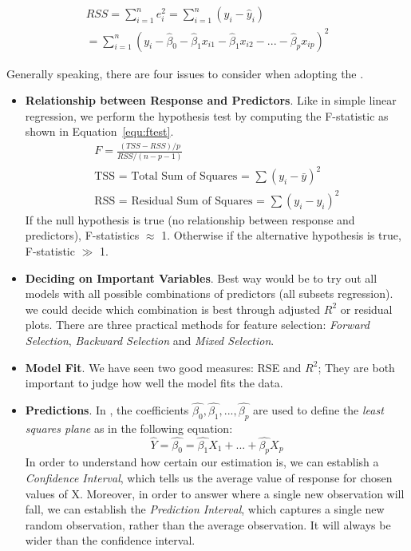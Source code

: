 \begin{multline}
\label{equ:rss}
  RSS = \sum_{i = 1}^{n}{e_i^2} = \sum_{i = 1}^{n}{(y_i - \hat{y}_i)}\\
   = \sum_{i = 1}^{n}{(y_i - \hat{\beta}_0 - \hat{\beta}_1x_{i1} - \hat{\beta}_1x_{i2} - ... - \hat{\beta}_px_{ip})^2}
\end{multline}

Generally speaking, there are four issues to consider when adopting the {\mlr}.
\begin{itemize}
  \item \textbf{Relationship between Response and Predictors}. Like in simple linear regression, we perform the hypothesis test by computing the F-statistic as shown in Equation~\ref{equ:ftest}.
      \begin{multline}\label{equ:ftest}
        F = \frac{(TSS - RSS)/p}{RSS/(n - p - 1)}\\
        \text{TSS = Total Sum of Squares = $\sum{(y_i - \bar{y})^2}$}\\
        \text{RSS = Residual Sum of Squares = $\sum{(y_i - \hat{y_i})^2}$}
      \end{multline}
      If the null hypothesis is true (no relationship between response and predictors), F-statistics $\approx$ 1. Otherwise if the alternative hypothesis is true, F-statistic $\gg$ 1.
  \item \textbf{Deciding on Important Variables}. Best way would be to try out all models with all possible combinations of predictors (all subsets regression). we could decide which combination is best through adjusted $R^2$ or residual plots. There are three practical methods for feature selection: \emph{Forward Selection}, \emph{Backward Selection} and \emph{Mixed Selection}.
  \item \textbf{Model Fit}. We have seen two good measures: RSE and $R^2$; They are both important to judge how well the model fits the data.
  \item \textbf{Predictions}. In {\mlr}, the coefficients $\hat{\beta_0}, \hat{\beta_1},...,\hat{\beta_p}$ are used to define the \emph{least squares plane} as in the following equation:
      \begin{equation}\label{equ:plane}
        \hat{Y} = \hat{\beta_0} = \hat{\beta_1}X_1 + ... + \hat{\beta_p}X_p
      \end{equation}
      In order to understand how certain our estimation is, we can establish a \emph{Confidence Interval}, which tells us the average value of response for chosen values of X. Moreover, in order to answer where a single new observation will fall, we can establish the \emph{Prediction Interval}, which captures a single new random observation, rather than the average observation. It will always be wider than the confidence interval.
\end{itemize}

